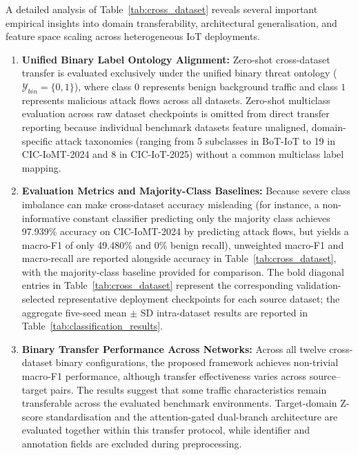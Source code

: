 \documentclass[a4paper,fleqn]{cas-sc}
\begin{document}
A detailed analysis of Table~\ref{tab:cross_dataset} reveals several important empirical insights into domain transferability, architectural generalisation, and feature space scaling across heterogeneous IoT deployments.

\begin{enumerate}
    \item \textbf{Unified Binary Label Ontology Alignment:}
    Zero-shot cross-dataset transfer is evaluated exclusively under the unified binary threat ontology ($\mathcal{Y}_{bin} = \{0, 1\}$), where class $0$ represents benign background traffic and class $1$ represents malicious attack flows across all datasets. Zero-shot multiclass evaluation across raw dataset checkpoints is omitted from direct transfer reporting because individual benchmark datasets feature unaligned, domain-specific attack taxonomies (ranging from 5 subclasses in BoT-IoT to 19 in CIC-IoMT-2024 and 8 in CIC-IoT-2025) without a common multiclass label mapping.

    \item \textbf{Evaluation Metrics and Majority-Class Baselines:}
    Because severe class imbalance can make cross-dataset accuracy misleading (for instance, a non-informative constant classifier predicting only the majority class achieves 97.939\% accuracy on CIC-IoMT-2024 by predicting attack flows, but yields a macro-F1 of only 49.480\% and 0\% benign recall), unweighted macro-F1 and macro-recall are reported alongside accuracy in Table~\ref{tab:cross_dataset}, with the majority-class baseline provided for comparison. The bold diagonal entries in Table~\ref{tab:cross_dataset} represent the corresponding validation-selected representative deployment checkpoints for each source dataset; the aggregate five-seed mean $\pm$ SD intra-dataset results are reported in Table~\ref{tab:classification_results}.

    \item \textbf{Binary Transfer Performance Across Networks:}
    Across all twelve cross-dataset binary configurations, the proposed framework achieves non-trivial macro-F1 performance, although transfer effectiveness varies across source--target pairs. The results suggest that some traffic characteristics remain transferable across the evaluated benchmark environments. Target-domain Z-score standardisation and the attention-gated dual-branch architecture are evaluated together within this transfer protocol, while identifier and annotation fields are excluded during preprocessing.


\end{enumerate}
\end{document}

